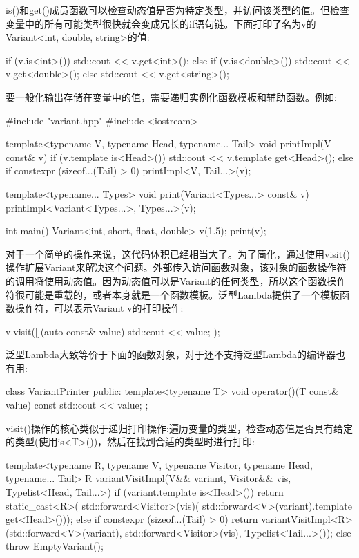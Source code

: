 
is()和get()成员函数可以检查动态值是否为特定类型，并访问该类型的值。但检查变量中的所有可能类型很快就会变成冗长的if语句链。下面打印了名为v的Variant<int, double, string>的值:

\begin{cpp}
if (v.is<int>()) {
	std::cout << v.get<int>();
}
else if (v.is<double>()) {
	std::cout << v.get<double>();
}
else {
	std::cout << v.get<string>();
}
\end{cpp}

要一般化输出存储在变量中的值，需要递归实例化函数模板和辅助函数。例如:

\begin{cpp}
#include "variant.hpp"
#include <iostream>

template<typename V, typename Head, typename... Tail>
void printImpl(V const& v)
{
	if (v.template is<Head>()) {
		std::cout << v.template get<Head>();
	}
	else if constexpr (sizeof...(Tail) > 0) {
		printImpl<V, Tail...>(v);
	}
}

template<typename... Types>
void print(Variant<Types...> const& v)
{
	printImpl<Variant<Types...>, Types...>(v);
}

int main() {
	Variant<int, short, float, double> v(1.5);
	print(v);
}
\end{cpp}

对于一个简单的操作来说，这代码体积已经相当大了。为了简化，通过使用visit()操作扩展Variant来解决这个问题。外部传入访问函数对象，该对象的函数操作符的调用将使用动态值。因为动态值可以是Variant的任何类型，所以这个函数操作符很可能是重载的，或者本身就是一个函数模板。泛型Lambda提供了一个模板函数操作符，可以表示Variant v的打印操作:

\begin{cpp}
v.visit([](auto const& value) {
			std::cout << value;
		});
\end{cpp}

泛型Lambda大致等价于下面的函数对象，对于还不支持泛型Lambda的编译器也有用:

\begin{cpp}
class VariantPrinter {
	public:
	template<typename T>
	void operator()(T const& value) const
	{
		std::cout << value;
	}
};
\end{cpp}

visit()操作的核心类似于递归打印操作:遍历变量的类型，检查动态值是否具有给定的类型(使用is<T>())，然后在找到合适的类型时进行打印:

\begin{cpp}
template<typename R, typename V, typename Visitor,
		 typename Head, typename... Tail>
R variantVisitImpl(V&& variant, Visitor&& vis, Typelist<Head, Tail...>) {
	if (variant.template is<Head>()) {
		return static_cast<R>(
		std::forward<Visitor>(vis)(
		std::forward<V>(variant).template get<Head>()));
	}
	else if constexpr (sizeof...(Tail) > 0) {
		return variantVisitImpl<R>(std::forward<V>(variant),
		std::forward<Visitor>(vis),
		Typelist<Tail...>());
	}
	else {
		throw EmptyVariant();
	}
}
\end{cpp}

